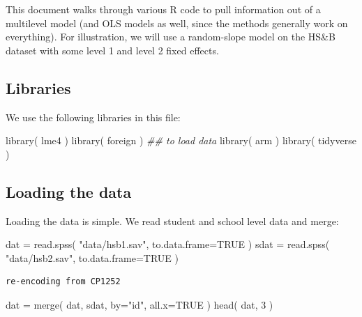 \documentclass[
  letterpaper,
  DIV=11,
  numbers=noendperiod]{scrreprt}
\newenvironment{Shaded}{\begin{snugshade}}{\end{snugshade}}
\newcommand{\AttributeTok}[1]{\textcolor[rgb]{0.49,0.56,0.16}{#1}}
\newcommand{\ConstantTok}[1]{\textcolor[rgb]{0.53,0.00,0.00}{#1}}
\newcommand{\DecValTok}[1]{\textcolor[rgb]{0.25,0.63,0.44}{#1}}
\newcommand{\DocumentationTok}[1]{\textcolor[rgb]{0.73,0.13,0.13}{\textit{#1}}}
\newcommand{\FunctionTok}[1]{\textcolor[rgb]{0.02,0.16,0.49}{#1}}
\newcommand{\NormalTok}[1]{\textcolor[rgb]{0.00,0.44,0.13}{#1}}
\newcommand{\OtherTok}[1]{\textcolor[rgb]{0.00,0.44,0.13}{#1}}
\newcommand{\StringTok}[1]{\textcolor[rgb]{0.25,0.44,0.63}{#1}}
\begin{document}
This document walks through various R code to pull information out of a
multilevel model (and OLS models as well, since the methods generally
work on everything). For illustration, we will use a random-slope model
on the HS\&B dataset with some level 1 and level 2 fixed effects.

\hypertarget{libraries}{%
\subsection{Libraries}\label{libraries}}

We use the following libraries in this file:

\begin{Shaded}
\begin{Highlighting}[]
\FunctionTok{library}\NormalTok{( lme4 )}
\FunctionTok{library}\NormalTok{( foreign ) }\DocumentationTok{\#\# to load data}
\FunctionTok{library}\NormalTok{( arm )}
\FunctionTok{library}\NormalTok{( tidyverse )}
\end{Highlighting}
\end{Shaded}

\hypertarget{loading-the-data}{%
\subsection{Loading the data}\label{loading-the-data}}

Loading the data is simple. We read student and school level data and
merge:

\begin{Shaded}
\begin{Highlighting}[]
\NormalTok{dat }\OtherTok{=} \FunctionTok{read.spss}\NormalTok{( }\StringTok{"data/hsb1.sav"}\NormalTok{, }\AttributeTok{to.data.frame=}\ConstantTok{TRUE}\NormalTok{ )}
\NormalTok{sdat }\OtherTok{=} \FunctionTok{read.spss}\NormalTok{( }\StringTok{"data/hsb2.sav"}\NormalTok{, }\AttributeTok{to.data.frame=}\ConstantTok{TRUE}\NormalTok{ )}
\end{Highlighting}
\end{Shaded}

\begin{verbatim}
re-encoding from CP1252
\end{verbatim}

\begin{Shaded}
\begin{Highlighting}[]
\NormalTok{dat }\OtherTok{=} \FunctionTok{merge}\NormalTok{( dat, sdat, }\AttributeTok{by=}\StringTok{"id"}\NormalTok{, }\AttributeTok{all.x=}\ConstantTok{TRUE}\NormalTok{ )}
\FunctionTok{head}\NormalTok{( dat, }\DecValTok{3}\NormalTok{ )}
\end{Highlighting}
\end{Shaded}
\end{document}
